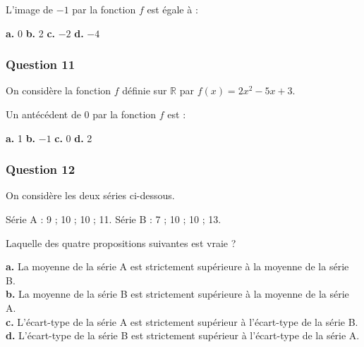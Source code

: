\documentclass[10pt]{article}
\begin{document}
L'image de $-1$ par la fonction $f$ est égale à :

\textbf{a.} 0 \hfill \textbf{b.} 2 \hfill \textbf{c.} $-2$ \hfill \textbf{d.} $-4$

\subsubsection*{Question 11}
On considère la fonction $f$ définie sur $\mathbb{R}$ par $f(x) = 2x^2 - 5x + 3$.

Un antécédent de 0 par la fonction $f$ est :

\textbf{a.} 1 \hfill \textbf{b.} $-1$ \hfill \textbf{c.} 0 \hfill \textbf{d.} 2

\subsubsection*{Question 12}
On considère les deux séries ci-dessous.

Série A : 9 ; 10 ; 10 ; 11. \hfill Série B : 7 ; 10 ; 10 ; 13.

Laquelle des quatre propositions suivantes est vraie ?

\textbf{a.} La moyenne de la série A est strictement supérieure à la moyenne de la série B. \\
\textbf{b.} La moyenne de la série B est strictement supérieure à la moyenne de la série A. \\
\textbf{c.} L'écart-type de la série A est strictement supérieur à l'écart-type de la série B. \\
\textbf{d.} L'écart-type de la série B est strictement supérieur à l'écart-type de la série A.
\end{document}
